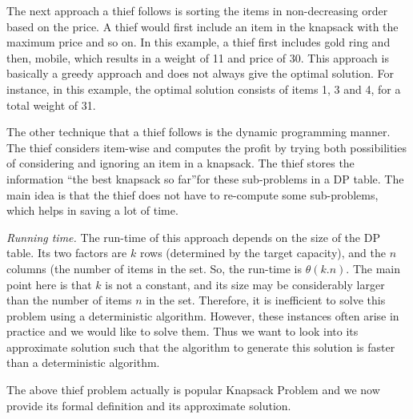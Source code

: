 The next approach a thief follows is sorting the items in non-decreasing order based on the price.
A thief would first include an item in the knapsack with the maximum price and so on.
In this example, a thief first includes gold ring and then, mobile, which results in a weight of 11 and price of 30.
This approach is basically a greedy approach and does not always give the optimal solution. 
For instance, in this example, the optimal solution consists of items 1, 3 and 4, for a total weight of 31.

The other technique that a thief follows is the dynamic programming manner. 
The thief considers item-wise and computes the profit by trying both possibilities of considering and ignoring an item in a knapsack.
The thief stores the information ``the best knapsack so far''for these sub-problems in a DP table.
The main idea is that the thief does not have to re-compute some sub-problems, which helps in saving a lot of time.


\textit{Running time.} The run-time of this approach depends on the size of the DP table. 
Its two factors are $k$ rows (determined by the target capacity), and the $n$ columns (the number of items in the set. So, the run-time is $\theta(k.n)$. 
The main point here is that $k$ is not a constant, and its size may be considerably larger than the number of items $n$ in the set. 
Therefore, it is inefficient to solve this problem using a deterministic algorithm.
However, these instances often arise in practice and we would like to solve them. 
Thus we want to look into its approximate solution such that the algorithm to generate this solution is faster than a deterministic algorithm.

The above thief problem actually is popular Knapsack Problem and we now provide its formal definition and its approximate solution.

